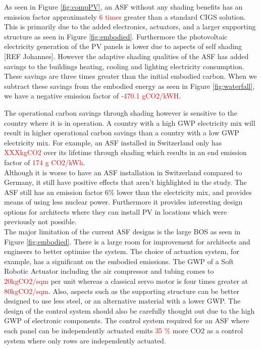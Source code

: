 


As seen in Figure \ref{fig:compPV}, an ASF without any shading benefits has an emission factor approximately \textcolor{red}{6 times } greater than a standard CIGS solution. This is primarily due to the added electronics, actuators, and a larger supporting structure as seen in Figure \ref{fig:embodied}. Furthermore the photovoltaic electricity generation of the PV panels is lower due to aspects of self shading [REF Johannes]. However the adaptive shading qualities of the ASF has added savings to the buildings heating, cooling and lighting electricity consumption. These savings are three times greater than the initial embodied carbon. When we subtract these savings from the embodied energy as seen in Figure \ref{fig:waterfall}, we have a negative emission factor of \textcolor{red}{-470.1 gCO2/kWH}. 

The operational carbon savings through shading however is sensitive to the country where it is in operation. A country with a high GWP electricity mix will result in higher operational carbon savings than a country with a low GWP electricity mix. For example, an ASF installed in Switzerland only has \textcolor{red}{XXXkgCO2} over its lifetime through shading which results in an end emission factor of \textcolor{red}{174 g CO2/kWh}. \\



Although it is worse to have an ASF installation in Switzerland compared to Germany, it still have positive effects that aren't highlighted in the study. The ASF still has an emission factor 6\% lower than the electricity mix, and provides means of using less nuclear power. Furthermore it provides interesting design options for architects where they can install PV in locations which were previously not possible.  \\

The major limitation of the current ASF designs is the large BOS as seen in Figure \ref{fig:embodied}. There is a large room for improvement for architects and engineers to better optimise the system. The choice of actuation system, for example, has a significant on the embodied emissions. The GWP of a Soft Robotic Actuator including the air compressor and tubing comes to \textcolor{red}{20kgCO2/sqm} per unit whereas a classical servo motor is four times greater at \textcolor{red}{80kgCO2/sqm}. Also, aspects such as the supporting structure can be better designed to use less steel, or an alternative material with a lower GWP. The design of the control system should also be carefully thought out due to the high GWP of electronic components. The control system required for an ASF where each panel can be independently actuated emits \textcolor{red}{35 \%} more CO2 as a control system where only rows are independently actuated. 





